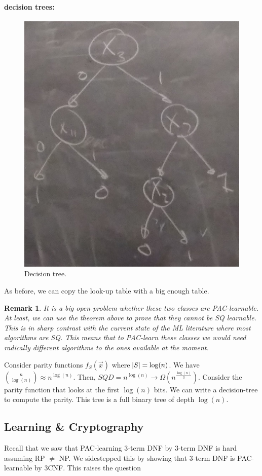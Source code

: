 \documentclass[12pt, letterpaper]{article}
\numberwithin{equation}{section} %
\newtheorem{remark}[theorem]{Remark}
\theoremstyle{definition}
\theoremstyle{remark}
\begin{document}
\paragraph{decision trees:}
\begin{figure}[H]
\centering
\includegraphics[width=0.6\linewidth]{../img/tree}
\caption{Decision tree.}
\end{figure}
As before, we can copy the look-up table with a big enough table.

\begin{remark}
It is a big open problem whether these two classes are PAC-learnable. At least, we can use the theorem above to prove that they cannot be SQ learnable. This is in sharp contrast with the current state of the ML literature where most algorithms are SQ. This means that to PAC-learn these classes we would need radically different algorithms to the ones available at the moment.
\end{remark}

Consider parity functions $f_S(\vec x)$ where $\abs{S} = \log(n)$. We have $\binom{n}{\log (n)} \approx n^{\log(n)}$. Then, $SQD = n^{\log(n)} \rightarrow \Omega(n^{\frac{\log(n)}3})$. Consider the parity function that looks at the first $\log(n)$ bits. We can write a decision-tree to compute the parity.  This tree is a full binary tree of depth $\log(n)$.

\subsection{Learning \& Cryptography}
Recall that we saw that PAC-learning 3-term DNF by 3-term DNF is hard assuming RP $\ne$ NP. We sidestepped this by showing that 3-term DNF is PAC-learnable by 3CNF. This raises the question
\end{document}
